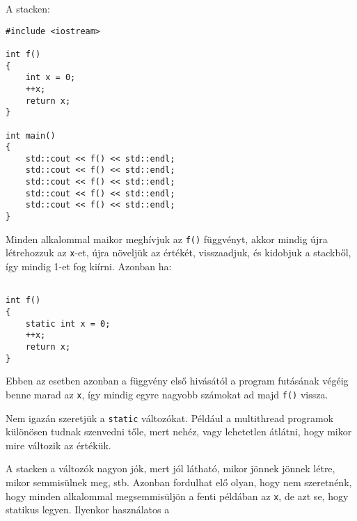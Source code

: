 \documentclass[a4paper,11.5pt]{article}
\begin{document}
	A stacken:
	\begin{lstlisting}
#include <iostream>

int f()
{
	int x = 0;
	++x;
	return x;
}

int main()
{
	std::cout << f() << std::endl;
	std::cout << f() << std::endl;
	std::cout << f() << std::endl;
	std::cout << f() << std::endl;
	std::cout << f() << std::endl;
}
	\end{lstlisting}
	Minden alkalommal maikor meghívjuk az \texttt{f()} függvényt, akkor mindig újra létrehozzuk az \texttt{x}-et, újra növeljük az értékét, visszaadjuk, és kidobjuk a stackből, így mindig 1-et fog kiírni. Azonban ha:
	\begin{lstlisting}

int f()
{
	static int x = 0;
	++x;
	return x;
}
	\end{lstlisting}
	Ebben az esetben azonban a függvény első hivásától a program futásának végéig benne marad az \texttt{x}, így mindig egyre nagyobb számokat ad majd \texttt{f()} vissza.
	\begin{note}
		Nem igazán szeretjük a \texttt{static} változókat. Például a multithread programok különösen tudnak szenvedni tőle, mert nehéz, vagy lehetetlen átlátni, hogy mikor mire változik az értékük.
	\end{note}
	A stacken a változók nagyon jók, mert jól látható, mikor jönnek jönnek létre, mikor semmisülnek meg, stb. Azonban fordulhat elő olyan, hogy nem szeretnénk, hogy minden alkalommal megsemmisüljön a fenti példában az \texttt{x}, de azt se, hogy statikus legyen. Ilyenkor használatos a
\end{document}
